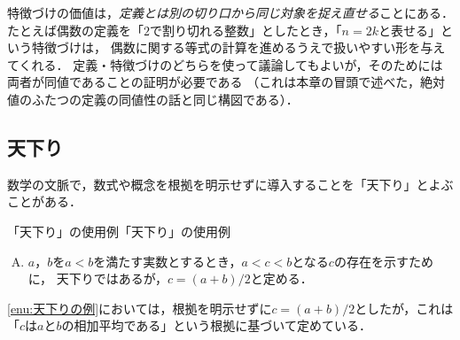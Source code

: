 特徴づけの価値は，\emph{定義とは別の切り口から同じ対象を捉え直せる}ことにある．
たとえば偶数の定義を「$2$で割り切れる整数」としたとき，「$n=2k$と表せる」という特徴づけは，
偶数に関する等式の計算を進めるうえで扱いやすい形を与えてくれる．
定義・特徴づけのどちらを使って議論してもよいが，そのためには両者が同値であることの証明が必要である
（これは本章の冒頭で述べた，絶対値のふたつの定義の同値性の話と同じ構図である）．

\subsection{天下り}

数学の文脈で，数式や概念を根拠を明示せずに導入することを「天下り」とよぶことがある．

\begin{example}{「天下り」の使用例}{「天下り」の使用例}
  \begin{enumerate}[(A)]
    \item $a$，$b$を$a<b$を満たす実数とするとき，$ a < c < b$となる$c$の存在を示すために，
    天下りではあるが，$c=(a+b)/2$と定める\label{enu:天下りの例}．
  \end{enumerate}
\end{example}

\ref{enu:天下りの例}においては，根拠を明示せずに$c=(a+b)/2$としたが，これは「$c$は$a$と$b$の相加平均である」という根拠に基づいて定めている．
